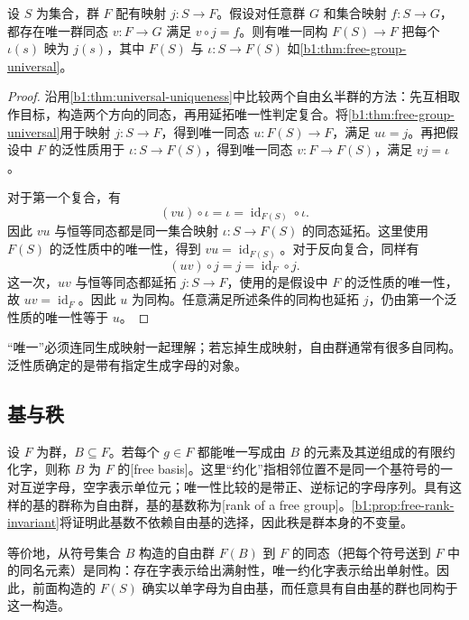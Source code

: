 \begin{proposition}\label{b1:prop:free-universal-unique}
	设 \(S\) 为集合，群 \(F\) 配有映射 \(j:S\to F\)。假设对任意群 \(G\) 和集合映射 \(f:S\to G\)，都存在唯一群同态 \(v:F\to G\) 满足 \(v\circ j=f\)。则有唯一同构 \(F(S)\to F\) 把每个 \(\iota(s)\) 映为 \(j(s)\)，其中 \(F(S)\) 与 \(\iota:S\to F(S)\) 如\cref{b1:thm:free-group-universal}。
\end{proposition}
\begin{proof}
	沿用\cref{b1:thm:universal-uniqueness}中比较两个自由幺半群的方法：先互相取作目标，构造两个方向的同态，再用延拓唯一性判定复合。将\cref{b1:thm:free-group-universal}用于映射 \(j:S\to F\)，得到唯一同态 \(u:F(S)\to F\)，满足 \(u\iota=j\)。再把假设中 \(F\) 的泛性质用于 \(\iota:S\to F(S)\)，得到唯一同态 \(v:F\to F(S)\)，满足 \(vj=\iota\)。

	对于第一个复合，有
	\[
		(vu)\circ\iota=\iota=\operatorname{id}_{F(S)}\circ\iota.
	\]
	因此 \(vu\) 与恒等同态都是同一集合映射 \(\iota:S\to F(S)\) 的同态延拓。这里使用 \(F(S)\) 的泛性质中的唯一性，得到 \(vu=\operatorname{id}_{F(S)}\)。对于反向复合，同样有
	\[
		(uv)\circ j=j=\operatorname{id}_F\circ j.
	\]
	这一次，\(uv\) 与恒等同态都延拓 \(j:S\to F\)，使用的是假设中 \(F\) 的泛性质的唯一性，故 \(uv=\operatorname{id}_F\)。因此 \(u\) 为同构。任意满足所述条件的同构也延拓 \(j\)，仍由第一个泛性质的唯一性等于 \(u\)。
\end{proof}

“唯一”必须连同生成映射一起理解；若忘掉生成映射，自由群通常有很多自同构。泛性质确定的是带有指定生成字母的对象。

\subsection{基与秩}
\label{b1:subsec:0801:03}

\begin{definition}\label{b1:def:free-basis-rank}
	设 \(F\) 为群，\(B\subseteq F\)。若每个 \(g\in F\) 都能唯一写成由 \(B\) 的元素及其逆组成的有限约化字，则称 \(B\) 为 \(F\) 的[free basis]。这里“约化”指相邻位置不是同一个基符号的一对互逆字母，空字表示单位元；唯一性比较的是带正、逆标记的字母序列。具有这样的基的群称为自由群，基的基数称为[rank of a free group]。\cref{b1:prop:free-rank-invariant}将证明此基数不依赖自由基的选择，因此秩是群本身的不变量。
\end{definition}

等价地，从符号集合 \(B\) 构造的自由群 \(F(B)\) 到 \(F\) 的同态（把每个符号送到 \(F\) 中的同名元素）是同构：存在字表示给出满射性，唯一约化字表示给出单射性。因此，前面构造的 \(F(S)\) 确实以单字母为自由基，而任意具有自由基的群也同构于这一构造。

